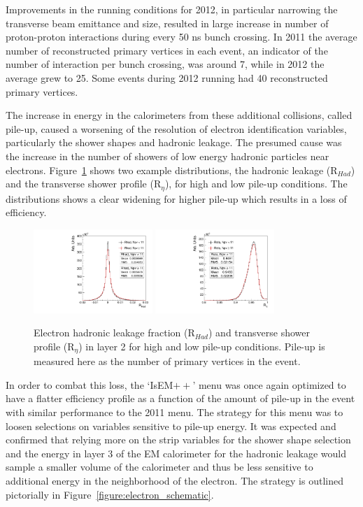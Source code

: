 Improvements in the running conditions for 2012, in particular narrowing the transverse beam emittance and size, resulted in large increase in number of proton-proton interactions during every 50 ns bunch crossing. In 2011 the average number of reconstructed primary vertices in each event, an indicator of the number of interaction per bunch crossing, was around 7, while in 2012 the average grew to 25. Some events during 2012 running had 40 reconstructed primary vertices.

The increase in energy in the calorimeters from these additional collisions, called pile-up, caused a worsening of the resolution of electron identification variables, particularly the shower shapes and hadronic leakage. The presumed cause was the increase in the number of showers of low energy hadronic particles near electrons.  Figure~\ref{figure:electron_pu} shows two example distributions, the hadronic leakage (R$_{Had}$) and the transverse shower profile (R$_{\eta}$), for high and low pile-up conditions. The distributions shows a clear widening for higher pile-up which results in a loss of efficiency. 

\begin{figure}[!t]
\centering 
\includegraphics[width=0.40\textwidth]{figs/electron/rhad_npv}
\includegraphics[width=0.40\textwidth]{figs/electron/reta_npv}
\caption {Electron hadronic leakage fraction (R$_{Had}$) and transverse shower profile (R$_{\eta}$) in layer 2 for high and low pile-up conditions. Pile-up is measured here as the number of primary vertices in the event.}
\label{figure:electron_pu}
\end{figure}


In order to combat this loss, the `IsEM$++$' menu was once again optimized to have a flatter efficiency profile as a function of the amount of pile-up in the event with similar performance to the 2011 menu. The strategy for this menu was to loosen selections on variables sensitive to pile-up energy. It was expected and confirmed that relying more on the strip variables for the shower shape selection and the energy in layer 3 of the EM calorimeter for the hadronic leakage would sample a smaller volume of the calorimeter and thus be less sensitive to additional energy in the neighborhood of the electron. The strategy is outlined pictorially in Figure~\ref{figure:electron_schematic}.  

